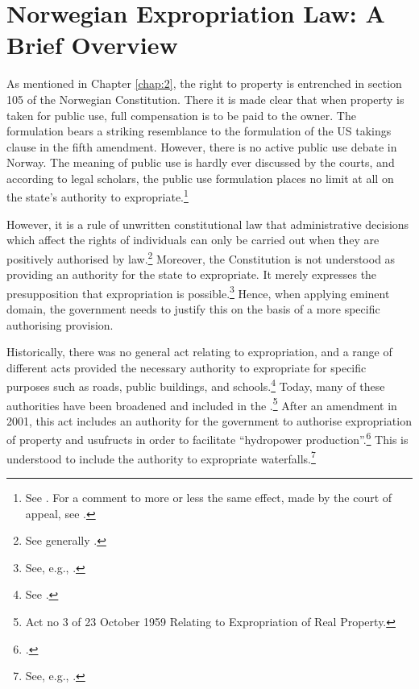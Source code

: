 \section{Norwegian Expropriation Law: A Brief Overview}\label{sec:5:2}

As mentioned in Chapter \ref{chap:2}, the right to property is entrenched in section 105 of the Norwegian Constitution. There it is made clear that when property is taken for public use, full compensation is to be paid to the owner. The formulation bears a striking resemblance to the formulation of the US takings clause in the fifth amendment. However, there is no active public use debate in Norway. The meaning of public use is hardly ever discussed by the courts, and according to legal scholars, the public use formulation places no limit at all on the state's authority to expropriate.\footnote{See \cite[249]{aall04}. For a comment to more or less the same effect, made by the court of appeal, see \cite{sauda09}.}

However, it is a rule of unwritten constitutional law that administrative decisions which affect the rights of individuals can only be carried out when they are positively authorised by law.\footnote{See generally \cite{hogberg11}.} Moreover, the Constitution is not understood as providing an authority for the state to expropriate. It merely expresses the presupposition that expropriation is possible.\footnote{See, e.g., \cite[6]{fleischer86}.} Hence, when applying eminent domain, the government needs to justify this on the basis of a more specific authorising provision. 

Historically, there was no general act relating to expropriation, and a range of different acts provided the necessary authority to expropriate for specific purposes such as roads, public buildings, and schools.\footnote{See \cite[11-12]{nut54}.} Today, many of these authorities have been broadened and included in the \cite{ea59}.\footnote{Act no 3 of 23 October 1959 Relating to Expropriation of Real Property.} After an amendment in 2001, this act includes an authority for the government to authorise expropriation of property and usufructs in order to facilitate ``hydropower production''.\footcite[2 no 51]{ea59} This is understood to include the authority to expropriate waterfalls.\footnote{See, e.g., 
\cite{sauda08}.}

